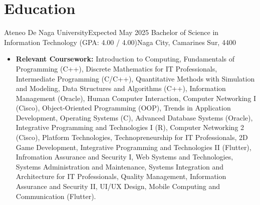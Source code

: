 \section{Education}
    \resumeSubHeadingListStart

    \resumeSubheading
    {Ateneo De Naga University}{Expected May 2025}
    {Bachelor of Science in Information Technology (GPA: 4.00 / 4.00)}{Naga City, Camarines Sur, 4400}
    \begin{itemize}
        \item[] \textbf{Relevant Coursework:} Introduction to Computing, Fundamentals of Programming (C++), Discrete Mathematics for IT Professionals, Intermediate Programming (C/C++), Quantitative Methods with Simulation and Modeling, Data Structures and Algorithms (C++), Information Management (Oracle), Human Computer Interaction, Computer Networking I (Cisco), Object-Oriented Programming (OOP), Trends in Application Development, Operating Systems (C), Advanced Database Systems (Oracle), Integrative Programming and Technologies I (R), Computer Networking 2 (Cisco), Platform Technologies, Technopreneurship for IT Professionals, 2D Game Development, Integrative Programming and Technologies II (Flutter), Infromation Assurance and Security I, Web Systems and Technologies, Systems Administration and Maintenance, Systems Integration and Architecture for IT Professionals, Quality Management, Information Assurance and Security II, UI/UX Design, Mobile Computing and Communication (Flutter).
    \end{itemize}

    \resumeSubHeadingListEnd